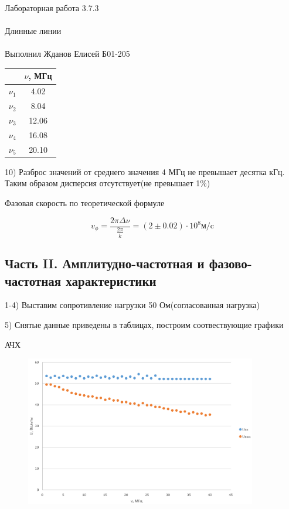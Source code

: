 \documentclass{astroedu-lab}
\begin{document}
\begin{problem}{\huge Лабораторная работа 3.7.3\\\\Длинные линии\\\\Выполнил Жданов Елисей Б01-205}
\begin{center}
\begin{tabular}{|c|c|}
\hline 
& $\nu$, МГц \\
\hline
$\nu_1$ & 4.02 \\
$\nu_2$ & 8.04 \\
$\nu_3$ & 12.06 \\
$\nu_4$ & 16.08 \\
$\nu_5$ & 20.10 \\
\hline
\end{tabular}
\end{center}

10) Разброс значений от среднего значения 4 МГц не превышает десятка кГц. Таким образом дисперсия отсутствует(не превышает 1$\%$)

Фазовая скорость по теоретической формуле

\begin{equation}
	v_\phi = \frac{2 \pi \Delta \nu}{\frac{2 \pi}{k}} = (2 \pm 0.02) \cdot 10^8 \text{м/c}
\end{equation}

\subsection{Часть II. Амплитудно-частотная и фазово-частотная характеристики}

1-4) Выставим сопротивление нагрузки 50 Ом(согласованная нагрузка)

5) Снятые данные приведены в таблицах, построим соотвествующие графики

\newpage

\begin{center}
	\Large АЧХ
\end{center}

\begin{figure}[!h]
	\centering
	\includegraphics[width=0.9\textwidth]{ачх.png}
	\label{fig:boiler}
\end{figure}


\end{problem}
\end{document}
